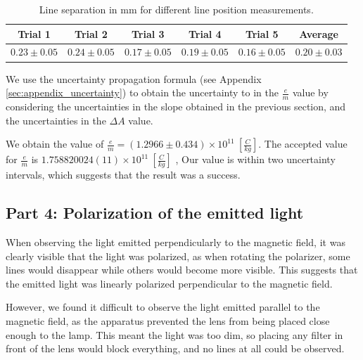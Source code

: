 \def\lineUncertainty{0.05}
\begin{table}[h]
    \centering
    \begin{tabular}{|c|c|c|c|c|c|}
        \hline
        Trial 1                     & Trial 2                     & Trial 3                     & Trial 4                     & Trial 5                     & Average         \\
        \hline
        $0.23 \pm \lineUncertainty$ & $0.24 \pm \lineUncertainty$ & $0.17 \pm \lineUncertainty$ & $0.19 \pm \lineUncertainty$ & $0.16 \pm \lineUncertainty$ & $0.20 \pm 0.03$ \\
        \hline
    \end{tabular}
    \caption{Line separation in mm for different line position measurements.}
    \label{table:line_separation}
\end{table}



We use the uncertainty propagation formula (see Appendix \ref{sec:appendix_uncertainty}) to obtain the uncertainty to in the $\frac{e}{m}$ value by considering the uncertainties in the slope obtained in the previous section, and the uncertainties in the $\Delta A$ value.

We obtain the value of $\frac{e}{m} = (1.2966\pm 0.434) \times 10^{11}~[\frac{C}{kg}]$. The accepted value for $\frac{e}{m}$ is $1.758820024(11) \times 10^{11}~[\frac{C}{kg}]$ \cite{MeasuringIOPSpark}, Our value is within two uncertainty intervals, which suggests that the result was a success.

\subsection{Part 4: Polarization of the emitted light}
When observing the light emitted perpendicularly to the magnetic field, it was clearly visible that the light was polarized, as when rotating the polarizer, some lines would disappear while others would become more visible.
This suggests that the emitted light was linearly polarized perpendicular to the magnetic field.

However, we found it difficult to observe the light emitted parallel to the
magnetic field, as the apparatus prevented the lens from being placed close enough
to the lamp. This meant the light was too dim, so placing any filter in front of the lens would block everything, and no
lines at all could be observed.
